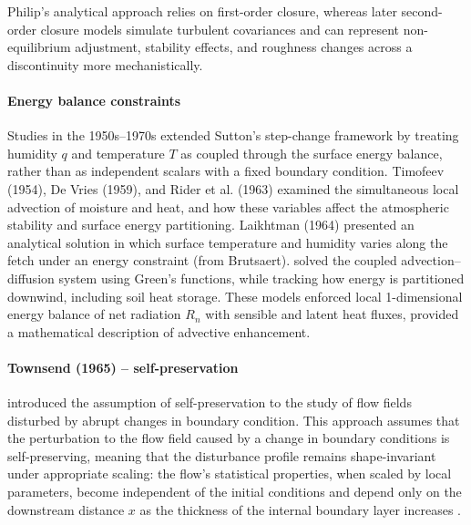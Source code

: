 \documentclass{article}
\begin{document}
    Philip’s analytical approach relies on first-order closure, whereas later second-order closure models \citet[e.g., ][]{rao1974local} simulate turbulent covariances and can represent non-equilibrium adjustment, stability effects, and roughness changes across a discontinuity more mechanistically. 

     \paragraph{Energy balance constraints}

     Studies in the 1950s–1970s extended Sutton’s step-change framework by treating humidity $q$ and temperature $T$ as coupled through the surface energy balance, rather than as independent scalars with a fixed boundary condition. 
    Timofeev (1954), De Vries (1959), and Rider et al. (1963) examined the simultaneous local advection of moisture and heat, and how these variables affect the atmospheric stability and surface energy partitioning.
    Laikhtman (1964) presented an analytical solution in which surface temperature and humidity varies along the fetch under an energy constraint (from Brutsaert).
     \citet{yeh_solution_1971}  solved the coupled advection–diffusion system using Green’s functions, while tracking how  energy is partitioned downwind, including soil heat storage. 
    These models enforced local 1-dimensional energy balance of net radiation $R_n$ with sensible and latent heat fluxes,
    provided a mathematical description of 
    advective enhancement.

    \paragraph{Townsend (1965) -- self-preservation}
    \citet{townsend_response_1965,townsend_self-preserving_1965} introduced the assumption of self-preservation to the study of flow fields disturbed by abrupt changes in boundary condition.
    This approach assumes that the perturbation to the flow field caused by a change in boundary conditions is self-preserving, meaning that the disturbance profile remains shape-invariant under appropriate scaling: the flow's statistical properties, when scaled by local parameters, become independent of the initial conditions and depend only on the downstream distance $x$ as the thickness of the internal boundary layer increases \cite{antonia1977response}.
\end{document}
